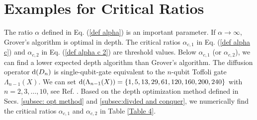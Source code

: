 \documentclass[%
 twocolumn,
 10pt,
 superscriptaddress,
 longbibliography,
 amsmath,amssymb,
 aps,
 pra,
floatfix,
]{revtex4-1}
\begin{document}
\section{\label{Appendix alpha} Examples for Critical Ratios}



The ratio $\alpha$ defined in Eq. (\ref{def alpha}) is an important parameter. If $\alpha\rightarrow \infty$, Grover's algorithm is optimal in depth. The critical ratios $\alpha_{c,1}$ in Eq. (\ref{def alpha c}) and $\alpha_{c,2}$ in Eq. (\ref{def alpha c 2}) are threshold values. Below $\alpha_{c,1}$ (or $\alpha_{c,2}$), we can find a lower expected depth algorithm than Grover's algorithm. The diffusion operator $\text d(D_n)$ is single-qubit-gate equivalent to the $n$-qubit Toffoli gate $\Lambda_{n-1}(X)$. We can set $\text d(\Lambda_{n-1}(X))=\{1,5,13,29,61,120,160,200,240\}$ with $n=2,3,\ldots,10$, see Ref. \cite{BBCDMSSSW95}. Based on the depth optimization method defined in Secs. \ref{subsec: opt method} and \ref{subsec:divded and conquer}, we numerically find the critical ratios $\alpha_{c,1}$ and $\alpha_{c,2}$ in Table \ref{Table 4}.
\end{document}
